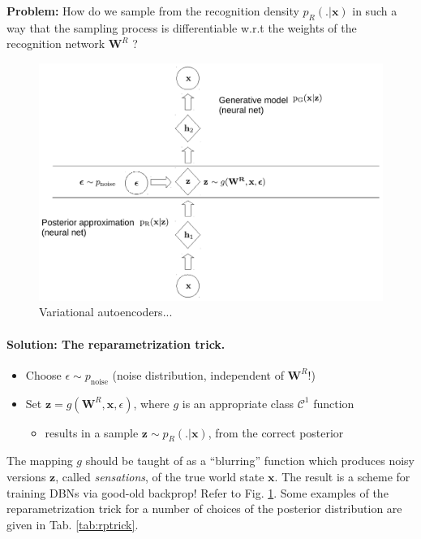 \documentclass[10pt,letterpaper]{article}
\def\z{\mathbf{z}}
\def\W{\mathbf{W}}
\def\x{\mathbf{x}}
\begin{document}
\begin{mdframed}
  \textbf{Problem:} How do we sample from the recognition density $p_R(.|\x)$ in such a way that the sampling process is differentiable w.r.t the weights of the recognition network $\W^R$ ?
\end{mdframed}
\begin{figure}[!tb]
  \centering
  \includegraphics[width=.8\linewidth]{vae.pdf}
  \caption{Variational autoencoders...}
  \label{fig:vae}
\end{figure}

\paragraph{Solution: The reparametrization trick.}
\begin{itemize}
\item Choose $\epsilon \sim p_{\text{noise}}$ (noise distribution, independent of $\W^R$!)
\item Set $\z = g(\W^{R}, \x, \epsilon)$, where $g$ is an appropriate class $\mathcal C^1$ function
  \begin{itemize}
  \item results in a sample $\z \sim p_R(.|\x)$, from the correct
    posterior
    \end{itemize}
\end{itemize}
The mapping $g$ should be taught of as a ``blurring'' function which produces noisy versions $\z$,
called \textit{sensations}, of the true world state $\x$.
The result is a scheme for training DBNs via good-old backprop! 
Refer to Fig. \ref{fig:vae}. Some examples of the reparametrization trick for a number of
choices of the posterior distribution are given in Tab. \ref{tab:rptrick}.
\end{document}
